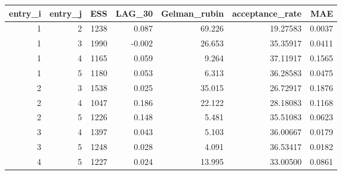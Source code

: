 \begin{longtable}{rrrrrrr}
\toprule
entry\_i & entry\_j & ESS & LAG\_30 & Gelman\_rubin & acceptance\_rate & MAE \\ 
\midrule
1 & 2 & 1238 & 0.087 & 69.226 & 19.27583 & 0.0037 \\ 
1 & 3 & 1990 & -0.002 & 26.653 & 35.35917 & 0.0411 \\ 
1 & 4 & 1165 & 0.059 & 9.264 & 37.11917 & 0.1565 \\ 
1 & 5 & 1180 & 0.053 & 6.313 & 36.28583 & 0.0475 \\ 
2 & 3 & 1538 & 0.025 & 35.015 & 26.72917 & 0.1876 \\ 
2 & 4 & 1047 & 0.186 & 22.122 & 28.18083 & 0.1168 \\ 
2 & 5 & 1226 & 0.148 & 5.481 & 35.51083 & 0.0623 \\ 
3 & 4 & 1397 & 0.043 & 5.103 & 36.00667 & 0.0179 \\ 
3 & 5 & 1248 & 0.028 & 4.091 & 36.53417 & 0.0182 \\ 
4 & 5 & 1227 & 0.024 & 13.995 & 33.00500 & 0.0861 \\ 
\bottomrule
\end{longtable}

